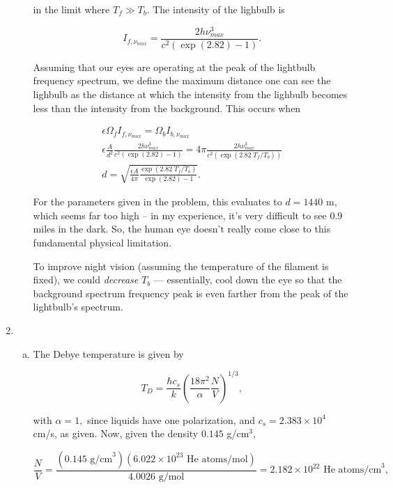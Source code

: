 \documentclass{article}
\begin{document}
\begin{enumerate}
\begin{enumerate}[(a)]
		in the limit where $T_f \gg T_b$. The intensity of the lighbulb is

		$$I_{f, \nu_{max}} = \frac{2 h \nu_{max}^3}{c^2 (\exp(2.82) - 1)}.$$

		Assuming that our eyes are operating at the peak of the lightbulb frequency spectrum, we define the maximum distance one can see the lighbulb as the distance at which the intensity from the lighbulb becomes less than the intensity from the background. This occurs when

		\begin{gather*}
		\epsilon \Omega_f I_{f, \nu_{max}} = \Omega_b I_{b, \nu_{max}} \\
		\epsilon \frac{A}{d^2} \frac{2 h \nu_{max}^3}{c^2 (\exp(2.82) - 1)} = 4 \pi \frac{2 h \nu_{max}^3}{c^2 (\exp(2.82 \; T_f / T_b))} \\
		d = \sqrt{\frac{\epsilon A}{4\pi} \frac{\exp(2.82 \; T_f / T_b)}{\exp(2.82) - 1}}.
		\end{gather*}

		For the parameters given in the problem, this evaluates to $d = 1440$ m, which seems far too high -- in my experience, it's very difficult to see 0.9 miles in the dark. So, the human eye doesn't really come close to this fundamental physical limitation.

		To improve night vision (assuming the temperature of the filament is fixed), we could \textit{decrease} $T_b$ — essentially, cool down the eye so that the background spectrum frequency peak is even farther from the peak of the lightbulb's spectrum.

	\end{enumerate}

	\item 

	\begin{enumerate}[(a)]

		\item 

		The Debye temperature is given by

		$$T_D = \frac{\hbar c_s}{k} \left( \frac{18 \pi^2}{\alpha} \frac{N}{V} \right)^{1/3},$$

		with $\alpha = 1,$ since liquids have one polarization, and $c_s = 2.383 \times 10^4$ cm/s, as given. Now, given the density $0.145$ g/cm$^3$,

		$$\frac{N}{V} = \frac{(0.145 \text{ g/cm}^3) (6.022 \times 10^{23} \text{ He atoms/mol})}{4.0026 \text{ g/mol}} = 2.182 \times 10^{22} \text{ He atoms/cm}^3,$$


\end{enumerate}
\end{enumerate}
\end{document}

